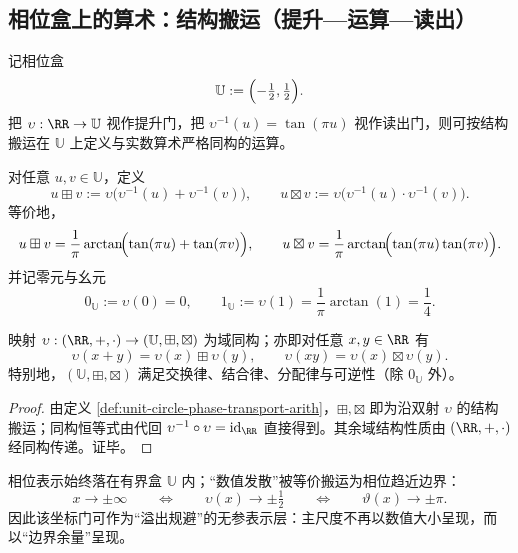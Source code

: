 \subsection{相位盒上的算术：结构搬运（提升—运算—读出）}\label{subsec:unit-circle-phase-arithmetic}
记相位盒
\[
\mathbb{U}:=\Bigl(-\tfrac12,\tfrac12\Bigr).
\]
把 \(\upsilon:\RR\to\mathbb{U}\) 视作提升门，把 \(\upsilon^{-1}(u)=\tan(\pi u)\) 视作读出门，则可按结构搬运在 \(\mathbb{U}\) 上定义与实数算术严格同构的运算。

\begin{definition}\label{def:unit-circle-phase-transport-arith}
对任意 \(u,v\in\mathbb{U}\)，定义
\[
u\boxplus v
:=\upsilon\!\bigl(\upsilon^{-1}(u)+\upsilon^{-1}(v)\bigr),
\qquad
u\boxtimes v
:=\upsilon\!\bigl(\upsilon^{-1}(u)\cdot\upsilon^{-1}(v)\bigr).
\]
等价地，
\[
u\boxplus v=\frac{1}{\pi}\arctan\!\Bigl(\tan(\pi u)+\tan(\pi v)\Bigr),
\qquad
u\boxtimes v=\frac{1}{\pi}\arctan\!\Bigl(\tan(\pi u)\tan(\pi v)\Bigr).
\]
并记零元与幺元
\[
0_{\mathbb{U}}:=\upsilon(0)=0,
\qquad
1_{\mathbb{U}}:=\upsilon(1)=\frac{1}{\pi}\arctan(1)=\frac14.
\]
\end{definition}

\begin{theorem}[与实数域严格同构]\label{thm:unit-circle-phase-field-iso}
映射
\(
\upsilon:(\RR,+,\cdot)\to(\mathbb{U},\boxplus,\boxtimes)
\)
为域同构；亦即对任意 \(x,y\in\RR\) 有
\[
\upsilon(x+y)=\upsilon(x)\boxplus\upsilon(y),
\qquad
\upsilon(xy)=\upsilon(x)\boxtimes\upsilon(y).
\]
特别地，\((\mathbb{U},\boxplus,\boxtimes)\) 满足交换律、结合律、分配律与可逆性（除 \(0_{\mathbb{U}}\) 外）。
\end{theorem}
\begin{proof}
由定义 \ref{def:unit-circle-phase-transport-arith}，\(\boxplus,\boxtimes\) 即为沿双射 \(\upsilon\) 的结构搬运；同构恒等式由代回 \(\upsilon^{-1}\circ \upsilon=\mathrm{id}_\RR\) 直接得到。其余域结构性质由 \((\RR,+,\cdot)\) 经同构传递。证毕。
\end{proof}

\begin{remark}[有界表示与边界承载发散]\label{rem:unit-circle-phase-bounded}
相位表示始终落在有界盒 \(\mathbb{U}\) 内；“数值发散”被等价搬运为相位趋近边界：
\[
x\to\pm\infty\qquad\Longleftrightarrow\qquad \upsilon(x)\to\pm\tfrac12
\qquad\Longleftrightarrow\qquad \vartheta(x)\to\pm\pi.
\]
因此该坐标门可作为“溢出规避”的无参表示层：主尺度不再以数值大小呈现，而以“边界余量”呈现。
\end{remark}

